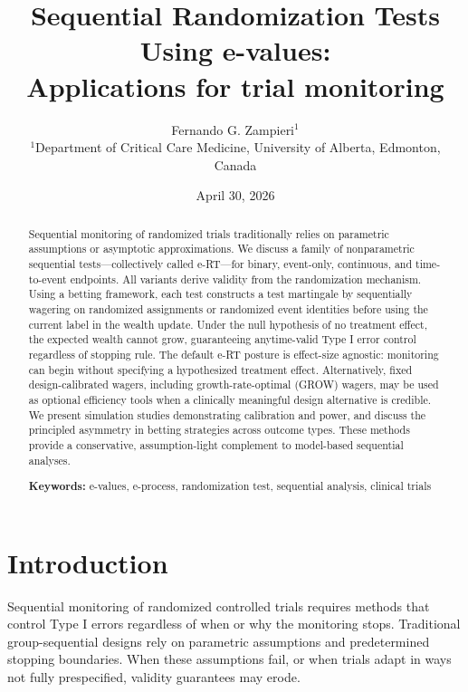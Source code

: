 \documentclass[10pt]{article}
\title{Sequential Randomization Tests Using e-values:\\ Applications for trial monitoring}
\author{
  Fernando G. Zampieri$^{1}$
  \\[1em]
  \small $^1$Department of Critical Care Medicine, University of Alberta, Edmonton, Canada \\
}
\date{April 30, 2026}
\begin{document}
\maketitle

\begin{abstract}
Sequential monitoring of randomized trials traditionally relies on parametric assumptions or asymptotic approximations. We discuss a family of nonparametric sequential tests---collectively called e-RT---for binary, event-only, continuous, and time-to-event endpoints. All variants derive validity from the randomization mechanism. Using a betting framework, each test constructs a test martingale by sequentially wagering on randomized assignments or randomized event identities before using the current label in the wealth update. Under the null hypothesis of no treatment effect, the expected wealth cannot grow, guaranteeing anytime-valid Type I error control regardless of stopping rule. The default e-RT posture is effect-size agnostic: monitoring can begin without specifying a hypothesized treatment effect. Alternatively, fixed design-calibrated wagers, including growth-rate-optimal (GROW) wagers, may be used as optional efficiency tools when a clinically meaningful design alternative is credible. We present simulation studies demonstrating calibration and power, and discuss the principled asymmetry in betting strategies across outcome types. These methods provide a conservative, assumption-light complement to model-based sequential analyses.

\medskip
\noindent\textbf{Keywords:} e-values, e-process, randomization test, sequential analysis, clinical trials
\end{abstract}

\section{Introduction}

Sequential monitoring of randomized controlled trials requires methods that control Type I errors regardless of when or why the monitoring stops. Traditional group-sequential designs rely on parametric assumptions and predetermined stopping boundaries. When these assumptions fail, or when trials adapt in ways not fully prespecified, validity guarantees may erode.
\end{document}
